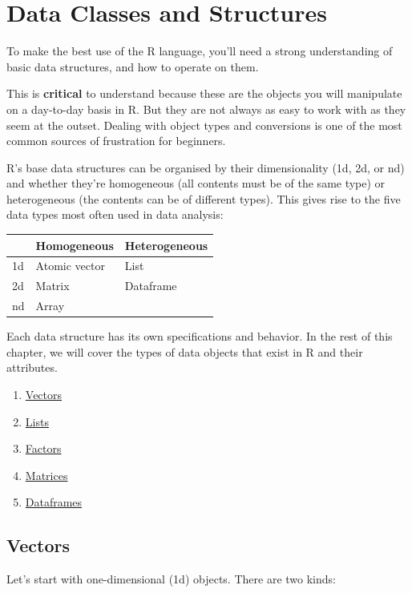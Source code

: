 \documentclass[]{book}
\providecommand{\tightlist}{%
  \setlength{\itemsep}{0pt}\setlength{\parskip}{0pt}}
\begin{document}
\chapter{Data Classes and Structures}\label{data-classes-and-structures}

To make the best use of the R language, you'll need a strong
understanding of basic data structures, and how to operate on them.

This is \textbf{critical} to understand because these are the objects
you will manipulate on a day-to-day basis in R. But they are not always
as easy to work with as they seem at the outset. Dealing with object
types and conversions is one of the most common sources of frustration
for beginners.

R's base data structures can be organised by their dimensionality (1d,
2d, or nd) and whether they're homogeneous (all contents must be of the
same type) or heterogeneous (the contents can be of different types).
This gives rise to the five data types most often used in data analysis:

\begin{longtable}[]{@{}lll@{}}
\toprule
& Homogeneous & Heterogeneous\tabularnewline
\midrule
\endhead
1d & Atomic vector & List\tabularnewline
2d & Matrix & Dataframe\tabularnewline
nd & Array &\tabularnewline
\bottomrule
\end{longtable}

Each data structure has its own specifications and behavior. In the rest
of this chapter, we will cover the types of data objects that exist in R
and their attributes.

\begin{enumerate}
\def\labelenumi{\arabic{enumi}.}
\tightlist
\item
  \protect\hyperlink{vectors}{Vectors}
\item
  \protect\hyperlink{lists}{Lists}
\item
  \protect\hyperlink{factors}{Factors}
\item
  \protect\hyperlink{matrices}{Matrices}
\item
  \protect\hyperlink{dataframes}{Dataframes}
\end{enumerate}

\hypertarget{vectors}{\section{Vectors}\label{vectors}}

Let's start with one-dimensional (1d) objects. There are two kinds:
\end{document}
